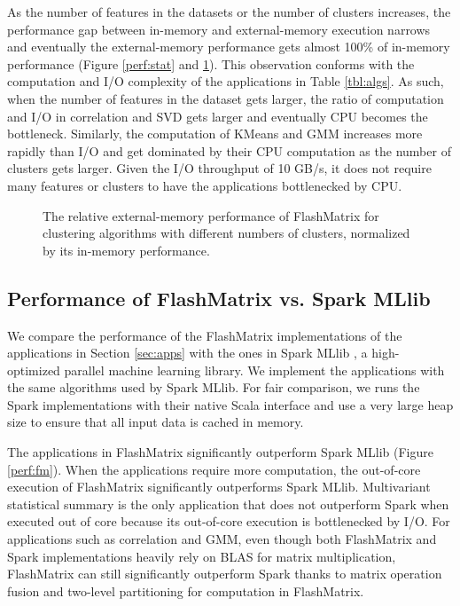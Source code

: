 As the number of features in the datasets or the number of clusters increases,
the performance gap between in-memory and external-memory execution
narrows and eventually the external-memory performance gets almost 100\%
of in-memory performance (Figure \ref{perf:stat} and \ref{perf:clust}).
This observation conforms with the computation and I/O complexity of
the applications in Table \ref{tbl:algs}. As such, when the number of features
in the dataset gets larger, the ratio of computation
and I/O in correlation and SVD gets larger and eventually CPU becomes
the bottleneck. Similarly, the computation of KMeans and GMM increases
more rapidly than I/O and get dominated by their CPU computation as the number
of clusters gets larger. Given the I/O throughput of 10 GB/s, it does not
require many features or clusters to have the applications bottlenecked by
CPU.

\begin{figure}
	\begin{center}
		\footnotesize
		
		\caption{The relative external-memory performance of FlashMatrix for
			clustering algorithms with different numbers of clusters, normalized
		by its in-memory performance.}
		\label{perf:clust}
	\end{center}
\end{figure}

\subsection{Performance of FlashMatrix vs. Spark MLlib}

We compare the performance of the FlashMatrix implementations of the applications
in Section \ref{sec:apps} with the ones in Spark MLlib \cite{mllib}, a high-
optimized parallel machine learning library. We implement the applications with
the same algorithms used by Spark MLlib. For fair comparison, we runs the Spark
implementations with their native Scala interface and use a very large heap size
to ensure that all input data is cached in memory.

The applications in FlashMatrix significantly outperform Spark MLlib (Figure
\ref{perf:fm}). When the applications require more computation, the out-of-core
execution of FlashMatrix significantly outperforms Spark MLlib. Multivariant
statistical summary is the only application that does not outperform Spark
when executed out of core because its out-of-core execution is bottlenecked
by I/O. For applications such as correlation and GMM, even though both FlashMatrix
and Spark implementations heavily rely on BLAS for matrix multiplication,
FlashMatrix can still significantly outperform Spark thanks to matrix operation
fusion and two-level partitioning for computation in FlashMatrix.


